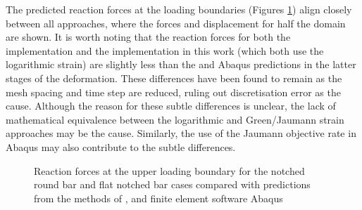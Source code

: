 \documentclass[sn-mathphys,Numbered]{sn-jnl}%
\begin{document}
The predicted reaction forces at the loading boundaries (Figures \ref{fig:plastic_forces}) align closely between all approaches, where the forces and displacement for half the domain are shown.
It is worth noting that the reaction forces for both the \citet{clancy_improving_2019} implementation and the implementation in this work (which both use the logarithmic strain) are slightly less than the \citet{cardiff_lagrangian_2017}  and Abaqus predictions in the latter stages of the deformation.
These differences have been found to remain as the mesh spacing and time step are reduced, ruling out discretisation error as the cause.
Although the reason for these subtle differences is unclear, the lack of mathematical equivalence between the logarithmic and Green/Jaumann strain approaches may be the cause.
Similarly, the use of the Jaumann objective rate in Abaqus \cite{soyarslan_finite_2010} may also contribute to the subtle differences.
\begin{figure}[htbp]
	\centering
		\caption{Reaction forces at the upper loading boundary for the notched round bar and flat notched bar cases compared with predictions from the methods of \citet{cardiff_lagrangian_2017}, \citet{clancy_improving_2019} and finite element software Abaqus}
	\label{fig:plastic_forces}
\end{figure}
\FloatBarrier
\end{document}
